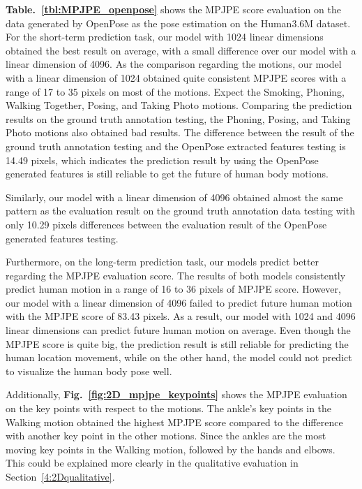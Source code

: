 \textbf{Table.~\ref{tbl:MPJPE_openpose}} shows the MPJPE score evaluation on the data generated by OpenPose as the pose estimation on the Human3.6M dataset. For the short-term prediction task, our model with 1024 linear dimensions obtained the best result on average, with a small difference over our model with a linear dimension of 4096. As the comparison regarding the motions, our model with a linear dimension of 1024 obtained quite consistent MPJPE scores with a range of 17 to 35 pixels on most of the motions. Expect the Smoking, Phoning, Walking Together, Posing, and Taking Photo motions. Comparing the prediction results on the ground truth annotation testing, the Phoning, Posing, and Taking Photo motions also obtained bad results. The difference between the result of the ground truth annotation testing and the OpenPose extracted features testing is 14.49 pixels, which indicates the prediction result by using the OpenPose generated features is still reliable to get the future of human body motions.

Similarly, our model with a linear dimension of 4096 obtained almost the same pattern as the evaluation result on the ground truth annotation data testing with only 10.29 pixels differences between the evaluation result of the OpenPose generated features testing. 

Furthermore, on the long-term prediction task, our models predict better regarding the MPJPE evaluation score. The results of both models consistently predict human motion in a range of 16 to 36 pixels of MPJPE score. However, our model with a linear dimension of 4096 failed to predict future human motion with the MPJPE score of 83.43 pixels. As a result, our model with 1024 and 4096 linear dimensions can predict future human motion on average. Even though the MPJPE score is quite big, the prediction result is still reliable for predicting the human location movement, while on the other hand, the model could not predict to visualize the human body pose well.

Additionally, \textbf{Fig.~\ref{fig:2D_mpjpe_keypoints}} shows the MPJPE evaluation on the key points with respect to the motions. The ankle's key points in the Walking motion obtained the highest MPJPE score compared to the difference with another key point in the other motions. Since the ankles are the most moving key points in the Walking motion, followed by the hands and elbows. This could be explained more clearly in the qualitative evaluation in Section~\ref{4:2Dqualitative}.

